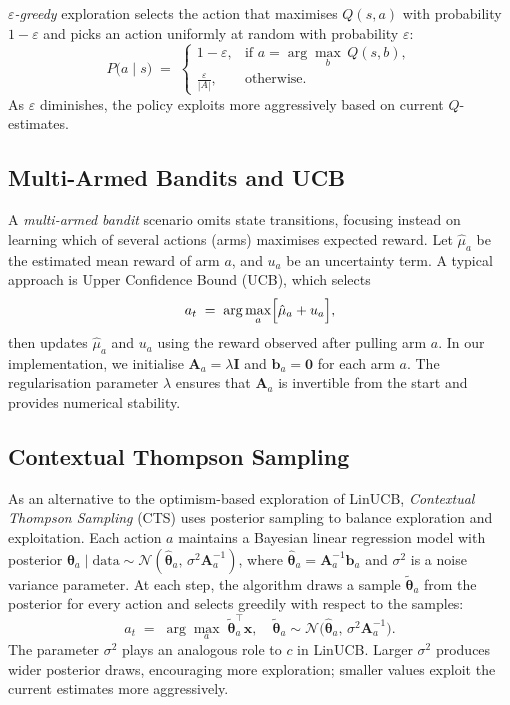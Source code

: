 \emph{$\varepsilon$-greedy} exploration selects the action that maximises $Q(s,a)$ with probability $1-\varepsilon$ and picks an action uniformly at random with probability $\varepsilon$:
\begin{equation}
P\bigl(a \mid s\bigr)
\;=\;
\begin{cases}
1-\varepsilon, & \text{if }a = \displaystyle\arg\max_{b}\,Q(s,b),\\
\displaystyle\frac{\varepsilon}{|A|}, & \text{otherwise}.
\end{cases}
\label{eq:egreedy}
\end{equation}
As $\varepsilon$ diminishes, the policy exploits more aggressively based on current $Q$-estimates.

\subsection{Multi-Armed Bandits and UCB}

A \emph{multi-armed bandit} scenario omits state transitions, focusing instead on learning which of several actions (arms) maximises expected reward. Let $\hat{\mu}_a$ be the estimated mean reward of arm $a$, and $u_a$ be an uncertainty term. A typical approach is Upper Confidence Bound (UCB), which selects
\begin{equation}
a_t
\;=\;
\arg\max_{a}\Bigl[\hat{\mu}_a + u_a\Bigr],
\end{equation}
then updates $\hat{\mu}_a$ and $u_a$ using the reward observed after pulling arm $a$. In our implementation, we initialise $\mathbf{A}_a = \lambda \mathbf{I}$ and $\mathbf{b}_a = \mathbf{0}$ for each arm $a$. The regularisation parameter $\lambda$ ensures that $\mathbf{A}_a$ is invertible from the start and provides numerical stability.

\subsection{Contextual Thompson Sampling}

As an alternative to the optimism-based exploration of LinUCB, \emph{Contextual Thompson Sampling} (CTS) uses posterior sampling to balance exploration and exploitation. Each action $a$ maintains a Bayesian linear regression model with posterior $\boldsymbol{\theta}_a \mid \text{data} \sim \mathcal{N}(\hat{\boldsymbol{\theta}}_a,\, \sigma^2 \mathbf{A}_a^{-1})$, where $\hat{\boldsymbol{\theta}}_a = \mathbf{A}_a^{-1}\mathbf{b}_a$ and $\sigma^2$ is a noise variance parameter. At each step, the algorithm draws a sample $\tilde{\boldsymbol{\theta}}_a$ from the posterior for every action and selects greedily with respect to the samples:
\begin{equation}
a_t \;=\; \arg\max_{a}\; \tilde{\boldsymbol{\theta}}_a^\top \mathbf{x}, \quad \tilde{\boldsymbol{\theta}}_a \sim \mathcal{N}\!\bigl(\hat{\boldsymbol{\theta}}_a,\, \sigma^2 \mathbf{A}_a^{-1}\bigr).
\end{equation}
The parameter $\sigma^2$ plays an analogous role to $c$ in LinUCB. Larger $\sigma^2$ produces wider posterior draws, encouraging more exploration; smaller values exploit the current estimates more aggressively.

